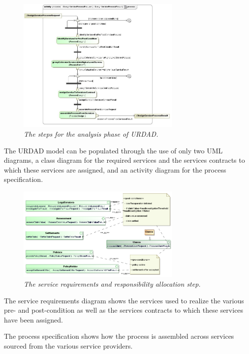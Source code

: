 \begin{figure}[ht!]
  \begin{center}
    \includegraphics[width=8cm]{urdadDesign}
    \caption{\it The steps for the analysis phase of URDAD.}
    \label{fig:urdadDesign}
  \end{center}
\end{figure}

The URDAD model can be populated through the use of only two UML diagrams,
a class diagram for the required
services and the services contracts to which these services are assigned, and an activity diagram
for the process specification.


\begin{figure}[ht!]
  \begin{center}
    \includegraphics[width=8cm]{serviceRequirements}
    \caption{\it The service requirements and responsibility allocation step.}
    \label{fig:serviceRequirements}
  \end{center}
\end{figure}

The service requirements diagram shows the services used to realize the various pre- and 
post-condition as well as the services contracts to which these services have been assigned.

The process specification shows how the process is assembled across services sourced from the
various service providers.

